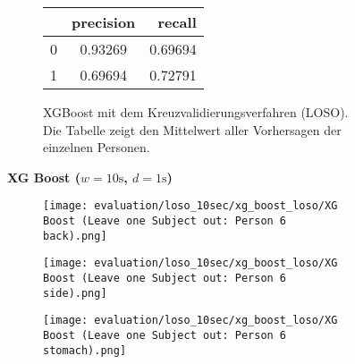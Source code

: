 \begin{figure}[H]
    \begin{subfigure}{1\textwidth}
        \begin{center}
            \begin{tabular}{ | l | c | r | }
              \hline
               & precision & recall \\ \hline
              0 & 0.93269 & 0.69694 \\ \hline
              1 & 0.69694 & 0.72791 \\
              \hline
            \end{tabular}
        \end{center}
        \caption{XGBoost mit dem Kreuzvalidierungsverfahren (LOSO). Die Tabelle zeigt den Mittelwert aller Vorhersagen der einzelnen Personen.}
        \label{implementation:app:screenshots:user_studies_information}
    \end{subfigure}
    \newline
    \vspace*{1 cm}
    \newline
    \textbf{XG Boost ($w=10\si{\s}$, $d=1\si{\s}$)}
    \begin{subfigure}{1\textwidth}
      \texttt{[image: evaluation/loso\_10sec/xg\_boost\_loso/XG Boost (Leave one Subject out: Person 6 back).png]}
    \end{subfigure}
    \begin{subfigure}{1\textwidth}
      \texttt{[image: evaluation/loso\_10sec/xg\_boost\_loso/XG Boost (Leave one Subject out: Person 6 side).png]}
    \end{subfigure}
    \begin{subfigure}{1\textwidth}
      \texttt{[image: evaluation/loso\_10sec/xg\_boost\_loso/XG Boost (Leave one Subject out: Person 6 stomach).png]}
  \end{subfigure}


\end{figure}
